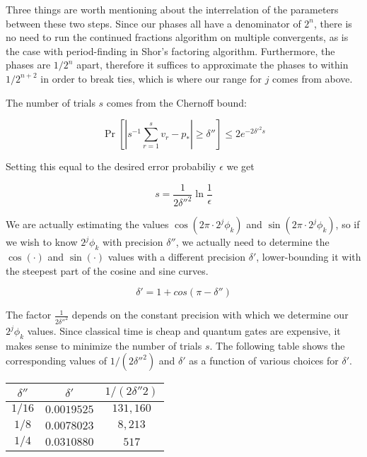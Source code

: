 Three things are worth mentioning about the interrelation of the parameters
between these two steps. Since our phases all have a denominator of $2^n$,
there is no need to run the continued fractions algorithm on multiple
convergents, as is the case with period-finding in Shor's factoring algorithm.
Furthermore, the phases are $1/2^n$ apart, therefore it suffices to approximate
the phases to within $1/2^{n+2}$ in order to break ties, which is where
our range for $j$ comes from above.

The number of trials $s$ comes from the Chernoff bound:

\begin{displaymath}
\Pr \left[ | s^{-1}\sum_{r=1}^s v_r - p_* | \ge \delta'' \right]
\le 2e^{-2\delta'^2 s}
\end{displaymath}

Setting this equal to the desired error probabiliy $\epsilon$ we get

\begin{displaymath}
s = \frac{1}{2\delta''^2}\ln \frac{1}{\epsilon}
\end{displaymath}

We are actually estimating the values $\cos(2\pi \cdot 2^j \phi_k)$ and
$\sin(2\pi \cdot 2^j \phi_k)$, so if we wish to know $2^j \phi_k$ with
precision $\delta''$, we actually need to determine the $\cos(\cdot)$ and
$\sin(\cdot)$ values with a different precision $\delta'$, lower-bounding
it with the steepest part of the cosine and sine curves.

\begin{displaymath}
\delta' = 1 + cos(\pi - \delta'')
\end{displaymath}

The factor $\frac{1}{2\delta''^2}$ depends on the constant precision with
which we determine our $2^j \phi_k$ values. Since classical time is
cheap and quantum gates are expensive, it makes sense to minimize the number
of trials $s$. The following table shows the corresponding values of $1/(2\delta''^2)$
and $\delta'$ as a function of various choices for $\delta'$.

\begin{center}
\begin{table}
\begin{tabular}{|c|c|c|}
\hline
$\delta''$ & $\delta'$   & $1/(2\delta''2)$\\
\hline
$1/16$     & $0.0019525$ & $131,160$\\
$1/8$      & $0.0078023$ & $  8,213$\\
$1/4$      & $0.0310880$ & $    517$\\
\hline
\end{tabular}
\end{table}
\end{center}

